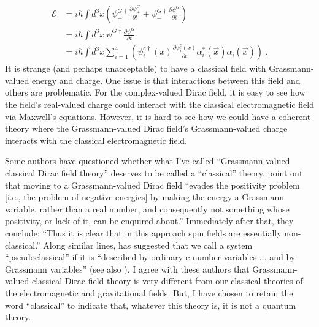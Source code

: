 \documentclass[12pt,secnumarabic,amsmath,amssymb,balancelastpage,nofootinbib]{article}
\begin{document}
\begin{align}
\mathcal{E}&=i \hbar \int{d^3 x \left( \psi_+^{G\dagger}\frac{\partial \psi^G_+}{\partial t} + \psi_-^{G\dagger}\frac{\partial \psi^G_-}{\partial t}\right)}
\nonumber
\\
&=i \hbar \int{d^3 x \ \psi^{G\dagger}\frac{\partial \psi^G}{\partial t}}
\nonumber
\\
&=i \hbar \int{d^3 x \sum_{i=1}^{4} \left( \psi_i^{c \dagger} (x) \frac{\partial \psi_i^c(x)}{\partial t} \alpha^{*}_i(\vec{x})\alpha_i(\vec{x}) \right)}
\ .
\label{classicalenergyGrassmann}
\end{align}
It is strange (and perhaps unacceptable) to have a classical field with Grassmann-valued energy and charge.  One issue is that interactions between this field and others are problematic.  For the complex-valued Dirac field, it is easy to see how the field's real-valued charge could interact with the classical electromagnetic field via Maxwell's equations.  However, it is hard to see how we could have a coherent theory where the Grassmann-valued Dirac field's Grassmann-valued charge interacts with the classical electromagnetic field.

Some authors have questioned whether what I've called ``Grassmann-valued classical Dirac field theory'' deserves to be called a ``classical'' theory.  \citet[pg.\ 28]{bailinlove} point out that moving to a Grassmann-valued Dirac field ``evades the positivity problem [i.e., the problem of negative energies] by making the energy a Grassmann variable, rather than a real number, and consequently not something whose positivity, or lack of it, can be enquired about.''  Immediately after that, they conclude: ``Thus it is clear that in this approach spin fields are essentially non-classical.''  Along similar lines, \citet{casalbuoni1976} has suggested that we call a system ``pseudoclassical'' if it is ``described by ordinary c-number variables ... and by Grassmann variables'' (see also \citealp[ch.\ 11]{freund1986}).  I agree with these authors that Grassmann-valued classical Dirac field theory is very different from our classical theories of the electromagnetic and gravitational fields.  But, I have chosen to retain the word ``classical'' to indicate that, whatever this theory is, it is not a quantum theory.
\end{document}
